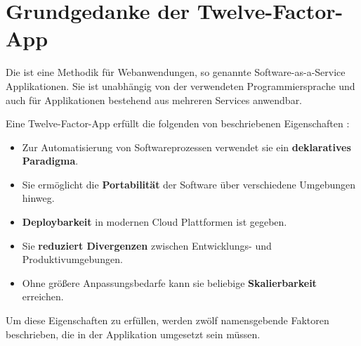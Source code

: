 \section{Grundgedanke der Twelve-Factor-App}
\label{sec:03-05_basic-idea-of-twelve-factor-app}

Die  ist eine Methodik für Webanwendungen, so genannte Software-as-a-Service Applikationen. Sie ist unabhängig von der verwendeten Programmiersprache und auch für Applikationen bestehend aus mehreren Services anwendbar. \cite{101:The-Twelve-Factor-App}

Eine Twelve-Factor-App erfüllt die folgenden von \citeauthor{103:Creating-Cloud-native-applications-12-Factor-Applications} beschriebenen Eigenschaften \cite{103:Creating-Cloud-native-applications-12-Factor-Applications}:

\begin{itemize}
    \item Zur Automatisierung von Softwareprozessen verwendet sie ein \textbf{deklaratives Paradigma}.
    \item Sie ermöglicht die \textbf{Portabilität} der Software über verschiedene Umgebungen hinweg.
    \item \textbf{Deploybarkeit} in modernen Cloud Plattformen ist gegeben.
    \item Sie \textbf{reduziert Divergenzen} zwischen Entwicklungs- und Produktivumgebungen.
    \item Ohne größere Anpassungsbedarfe kann sie beliebige \textbf{Skalierbarkeit} erreichen.
\end{itemize}

Um diese Eigenschaften zu erfüllen, werden zwölf namensgebende Faktoren beschrieben, die in der Applikation umgesetzt sein müssen.

